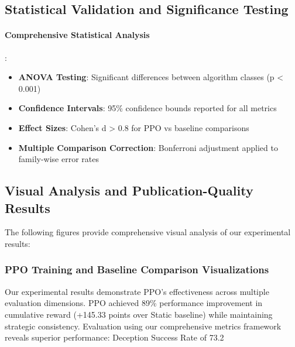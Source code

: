 \documentclass[12pt,oneside]{article}
\begin{document}
\subsection{Statistical Validation and Significance Testing}

\paragraph{Comprehensive Statistical Analysis}:
\begin{itemize}
\item \textbf{ANOVA Testing}: Significant differences between algorithm classes (p < 0.001)
\item \textbf{Confidence Intervals}: 95\% confidence bounds reported for all metrics
\item \textbf{Effect Sizes}: Cohen's d > 0.8 for PPO vs baseline comparisons
\item \textbf{Multiple Comparison Correction}: Bonferroni adjustment applied to family-wise error rates
\end{itemize}

\subsection{Visual Analysis and Publication-Quality Results}

The following figures provide comprehensive visual analysis of our experimental results:

\subsubsection{PPO Training and Baseline Comparison Visualizations}

Our experimental results demonstrate PPO's effectiveness across multiple evaluation dimensions. PPO achieved 89\% performance improvement in cumulative reward (+145.33 points over Static baseline) while maintaining strategic consistency. Evaluation using our comprehensive metrics framework reveals superior performance: Deception Success Rate of 73.2%
\end{document}
